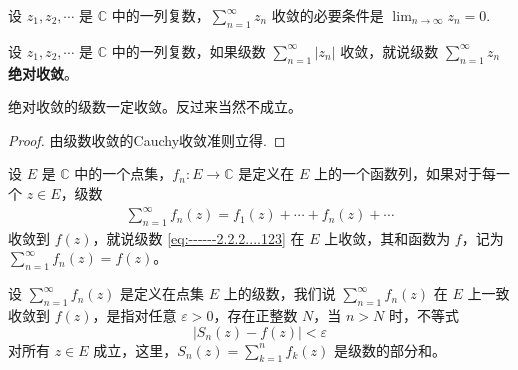 \documentclass[../../main.tex]{subfiles}
\begin{document}
\begin{corollary}\label{corollary:复幂级数收敛必要条件}
设 \( z_1, z_2, \cdots \) 是 \( \mathbb{C} \) 中的一列复数，\( \sum_{n=1}^{\infty} z_n \) 收敛的必要条件是 \( \lim_{n \to \infty} z_n = 0 \).
\end{corollary}

\begin{definition}
设 \( z_1, z_2, \cdots \) 是 \( \mathbb{C} \) 中的一列复数，如果级数 \( \sum_{n=1}^{\infty} |z_n| \) 收敛，就说级数 \( \sum_{n=1}^{\infty} z_n \) \textbf{绝对收敛}。
\end{definition}

\begin{proposition}
绝对收敛的级数一定收敛。反过来当然不成立。
\end{proposition}
\begin{proof}
由级数收敛的Cauchy收敛准则立得.

\end{proof}

\begin{definition}
设 \( E \) 是 \( \mathbb{C} \) 中的一个点集，\( f_n: E \to \mathbb{C} \) 是定义在 \( E \) 上的一个函数列，如果对于每一个 \( z \in E \)，级数
\begin{align}
\sum_{n=1}^{\infty} f_n(z) = f_1(z) + \cdots + f_n(z) + \cdots\label{eq:------2.2.2....123}
\end{align}
收敛到 \( f(z) \)，就说级数 \eqref{eq:------2.2.2....123} 在 \( E \) 上收敛，其和函数为 \( f \)，记为 \( \sum_{n=1}^{\infty} f_n(z) = f(z) \)。
\end{definition}

\begin{definition}
设 \( \sum_{n=1}^{\infty} f_n(z) \) 是定义在点集 \( E \) 上的级数，我们说 \( \sum_{n=1}^{\infty} f_n(z) \) 在 \( E \) 上一致收敛到 \( f(z) \)，是指对任意 \( \varepsilon > 0 \)，存在正整数 \( N \)，当 \( n > N \) 时，不等式
\[
|S_n(z) - f(z)| < \varepsilon
\]
对所有 \( z \in E \) 成立，这里，\( S_n(z) = \sum_{k=1}^{n} f_k(z) \) 是级数的部分和。
\end{definition}
\end{document}

